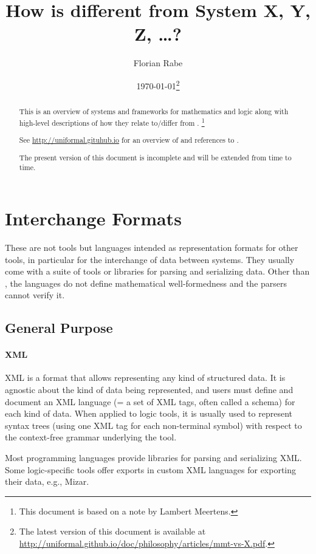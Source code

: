 \documentclass[12pt]{article}
\newcommand{\system}[2][]{\paragraph{#2}#2 \ifnonempty[\cite{#2}]{#1}{\cite{#1}}}
\begin{document}
\title{How is \mmt different from System X, Y, Z, \ldots ?}
\author{Florian Rabe}
\date{\today\footnote{The latest version of this document is available at \url{http://uniformal.github.io/doc/philosophy/articles/mmt-vs-X.pdf}.}}
\maketitle

\begin{abstract}
This is an overview of systems and frameworks for mathematics and logic along with high-level descriptions of how they relate to/differ from \mmt.
\footnote{This document is based on a note by Lambert Meertens.}

See \url{http://uniformal.gituhub.io} for an overview of and references to \mmt.

The present version of this document is incomplete and will be extended from time to time.
\end{abstract}

\section{Interchange Formats}

These are not tools but languages intended as representation formats for other tools, in particular for the interchange of data between systems.
They usually come with a suite of tools or libraries for parsing and serializing data.
Other than \mmt, the languages do not define mathematical well-formedness and the parsers cannot verify it.

\subsection{General Purpose}

\system{XML}
is a format that allows representing any kind of structured data.
It is agnostic about the kind of data being represented, and users must define and document an XML language (= a set of XML tags, often called a schema) for each kind of data.
When applied to logic tools, it is usually used to represent syntax trees (using one XML tag for each non-terminal symbol) with respect to the context-free grammar underlying the tool.

Most programming languages provide libraries for parsing and serializing XML.
Some logic-specific tools offer exports in custom XML languages for exporting their data, e.g., Mizar.
\end{document}
